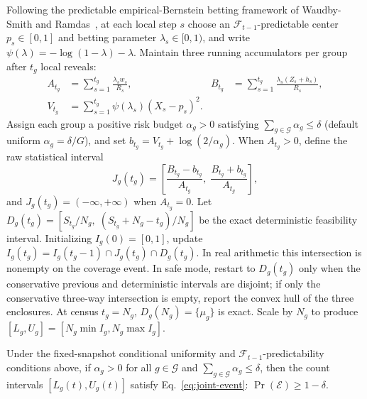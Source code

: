 Following the predictable empirical-Bernstein betting framework of Waudby-Smith and Ramdas~\cite{wor2020,waudby2024betting}, at each local step $s$ choose an $\mathcal{F}_{t-1}$-predictable center $p_s \in [0, 1]$ and betting parameter $\lambda_s \in [0, 1)$, and write $\psi(\lambda) = -\log(1 - \lambda) - \lambda$.
Maintain three running accumulators per group after $t_g$ local reveals:
\begin{align}
  A_{t_g} &= \sum_{s=1}^{t_g} \frac{\lambda_s w_s}{R_s}, &
  B_{t_g} &= \sum_{s=1}^{t_g} \frac{\lambda_s (Z_s + h_s)}{R_s}, \nonumber\\
  V_{t_g} &= \sum_{s=1}^{t_g} \psi(\lambda_s)(X_s - p_s)^2.
  \label{eq:accum}
\end{align}
Assign each group a positive risk budget $\alpha_g > 0$ satisfying $\sum_{g \in \mathcal{G}} \alpha_g \le \delta$ (default uniform $\alpha_g = \delta / G$), and set $b_{t_g} = V_{t_g} + \log(2 / \alpha_g)$.
When $A_{t_g} > 0$, define the raw statistical interval
\begin{equation}
  J_g(t_g) = \left[\frac{B_{t_g} - b_{t_g}}{A_{t_g}},\; \frac{B_{t_g} + b_{t_g}}{A_{t_g}}\right],
\end{equation}
and $J_g(t_g) = (-\infty, +\infty)$ when $A_{t_g} = 0$.
Let $D_g(t_g) = [S_{t_g}/N_g,\; (S_{t_g} + N_g - t_g)/N_g]$ be the exact deterministic feasibility interval.
Initializing $I_g(0) = [0, 1]$, update $I_g(t_g) = I_g(t_g - 1) \cap J_g(t_g) \cap D_g(t_g)$. In real arithmetic this intersection is nonempty on the coverage event. In safe mode, restart to $D_g(t_g)$ only when the conservative previous and deterministic intervals are disjoint; if only the conservative three-way intersection is empty, report the convex hull of the three enclosures. At census $t_g = N_g$, $D_g(N_g) = \{\mu_g\}$ is exact. Scale by $N_g$ to produce $[L_g, U_g] = [N_g \min I_g, N_g \max I_g]$.

\begin{theorem}
\label{thm:coverage}
Under the fixed-snapshot conditional uniformity and $\mathcal{F}_{t-1}$-predictability conditions above, if $\alpha_g > 0$ for all $g \in \mathcal{G}$ and $\sum_{g \in \mathcal{G}} \alpha_g \le \delta$, then the count intervals $[L_g(t), U_g(t)]$ satisfy Eq.~\eqref{eq:joint-event}: $\Pr(\mathcal{E}) \ge 1 - \delta$.
\end{theorem}

